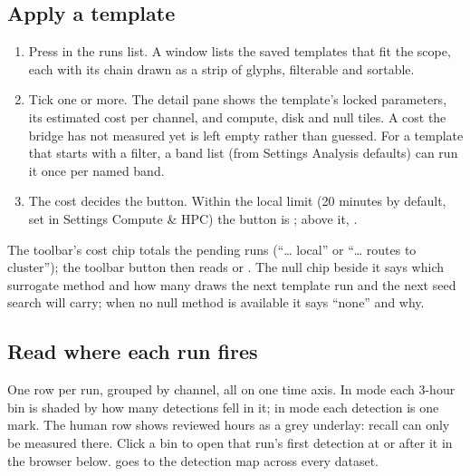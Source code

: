 \subsection*{Apply a template}
\begin{enumerate}
  \item Press  in the runs list. A window lists the saved templates that fit the
        scope, each with its chain drawn as a strip of glyphs, filterable and sortable.
  \item Tick one or more. The detail pane shows the template's locked parameters, its estimated
        cost per channel, and compute, disk and null tiles. A cost the bridge has not measured yet
        is left empty rather than guessed. For a template that starts with a filter, a band list
        (from Settings \textrightarrow{} Analysis defaults) can run it once per named band.
  \item The cost decides the button. Within the local limit (20 minutes by default, set in
        Settings \textrightarrow{} Compute \& HPC) the button is ; above it,
        .
\end{enumerate}
The toolbar's cost chip totals the pending runs (``\ldots{} local'' or ``\ldots{} routes to
cluster''); the toolbar button then reads  or . The
null chip beside it says which surrogate method and how many draws the next template run and the
next seed search will carry; when no null method is available it says ``none'' and why.

\subsection*{Read where each run fires}
One row per run, grouped by channel, all on one time axis. In  mode each 3-hour bin is
shaded by how many detections fell in it; in  mode each detection is one mark. The human
row shows reviewed hours as a grey underlay: recall can only be measured there. Click a bin to open
that run's first detection at or after it in the browser below.  goes to the
detection map across every dataset.

